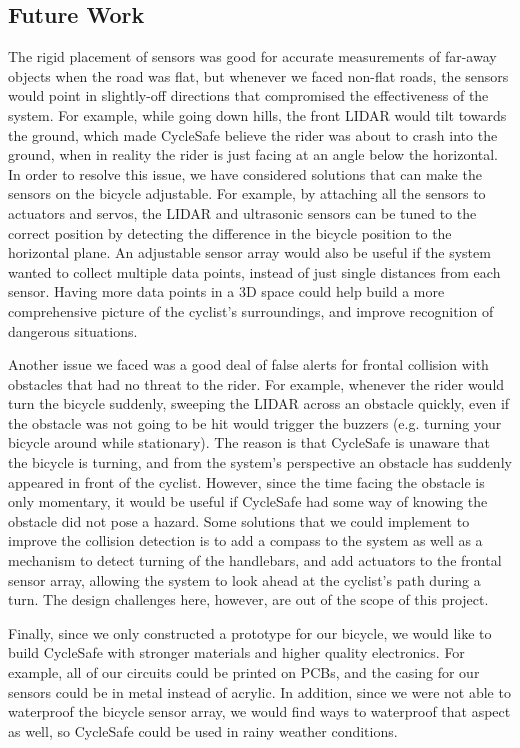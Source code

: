 \documentclass[journal]{IEEEtran}
\begin{document}
\subsection{Future Work}
The rigid placement of sensors was good for accurate measurements of far-away objects when the road was flat, but whenever we faced non-flat roads, the sensors would point in slightly-off directions that compromised the effectiveness of the system. For example, while going down hills, the front LIDAR would tilt towards the ground, which made CycleSafe believe the rider was about to crash into the ground, when in reality the rider is just facing at an angle below the horizontal. In order to resolve this issue, we have considered solutions that can make the sensors on the bicycle adjustable. For example, by attaching all the sensors to actuators and servos, the LIDAR and ultrasonic sensors can be tuned to the correct position by detecting the difference in the bicycle position to the horizontal plane. An adjustable sensor array would also be useful if the system wanted to collect multiple data points, instead of just single distances from each sensor. Having more data points in a 3D space could help build a more comprehensive picture of the cyclist's surroundings, and improve recognition of dangerous situations.

Another issue we faced was a good deal of false alerts for frontal collision with obstacles that had no threat to the rider. For example, whenever the rider would turn the bicycle suddenly, sweeping the LIDAR across an obstacle quickly, even if the obstacle was not going to be hit would trigger the buzzers (e.g. turning your bicycle around while stationary). The reason is that CycleSafe is unaware that the bicycle is turning, and from the system's perspective an obstacle has suddenly appeared in front of the cyclist. However, since the time facing the obstacle is only momentary, it would be useful if CycleSafe had some way of knowing the obstacle did not pose a hazard. Some solutions that we could implement to improve the collision detection is to add a compass to the system as well as a mechanism to detect turning of the handlebars, and add actuators to the frontal sensor array, allowing the system to look ahead at the cyclist's path during a turn. The design challenges here, however, are out of the scope of this project.

Finally, since we only constructed a prototype for our bicycle, we would like to build CycleSafe with stronger materials and higher quality electronics. For example, all of our circuits could be printed on PCBs, and the casing for our sensors could be in metal instead of acrylic. In addition, since we were not able to waterproof the bicycle sensor array, we would find ways to waterproof that aspect as well, so CycleSafe could be used in rainy weather conditions. 
\end{document}
